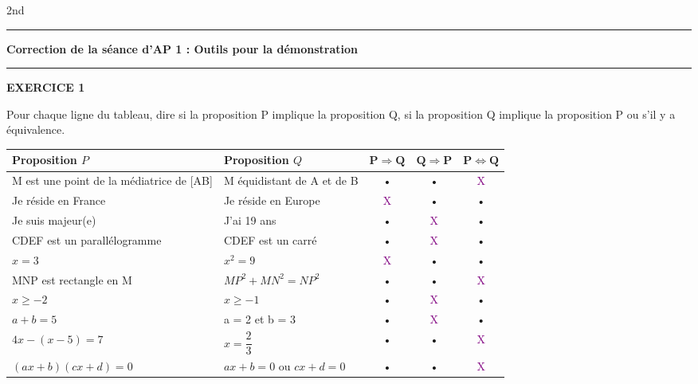 \documentclass[a4paper,11pt]{article}
\newcommand{\titre}[5] 
{
\noindent #2 \hfill #4 \\
#3 \hfill #5

\vspace{-1.6cm}

\begin{center}\rule{6cm}{0.5mm}\end{center}
\vspace{0.2cm}
\begin{center}{\Large{\textbf{#1}}}\end{center}
\begin{center}\rule{6cm}{0.5mm}\end{center}
}
\begin{document}
\pagestyle{empty}

\titre{Correction de la séance d'AP 1 : Outils pour la démonstration}{}{}{2nd}{}

\vspace*{0.2cm}



\vspace*{0.5cm}

\begin{large}
\textbf{EXERCICE 1}\\
\end{large}
Pour chaque ligne du tableau, dire si la proposition P implique la proposition Q, si la proposition Q implique la proposition P ou s'il y a équivalence.\\

\renewcommand{\arraystretch}{2}

\begin{tabular}{|p{5cm}|p{5cm}|c|c|c|}
\hline 
\textbf{Proposition $P$} & \textbf{Proposition $Q$} & $\mathbf{P \Rightarrow Q}$ & $\mathbf{Q \Rightarrow P}$ & $\mathbf{P \Leftrightarrow Q}$ \\ 
\hline 
M est une point de la médiatrice
de [AB] & M équidistant de A et de B & • & • & \textcolor{purple}{{\Large X}} \\ 
\hline 
Je réside en France & Je réside en Europe & \textcolor{purple}{{\Large X}}  & • & • \\ 
\hline 
Je suis majeur(e) & J’ai 19 ans & • & \textcolor{purple}{{\Large X}}  & • \\ 
\hline 
CDEF est un parallélogramme & CDEF est un carré & • & \textcolor{purple}{{\Large X}}  & • \\ 
\hline 
$x = 3$ & $x^{2} = 9$ & \textcolor{purple}{{\Large X}}  & • & • \\ 
\hline 
MNP est rectangle en M & $MP^{2} +MN^{2} = NP^{2}$ & • & • & \textcolor{purple}{{\Large X}}  \\ 
\hline 
$x\ge -2$ & $x\ge -1$ & • & \textcolor{purple}{{\Large X}}  & • \\ 
\hline 
$a+b=5$& a = 2 et b = 3 & • & \textcolor{purple}{{\Large X}}  & • \\ 
\hline 
$4x-(x-5)=7$ & $x=\dfrac{2}{3}$ & • & • & \textcolor{purple}{{\Large X}}  \\ 
\hline 
$(ax+b)(cx+d)=0$ &  $ax+b=0$ ou $cx+d=0$ & • & • & \textcolor{purple}{{\Large X}} \\ 
\hline 
\end{tabular} 


\vspace*{1cm}
\end{document}
